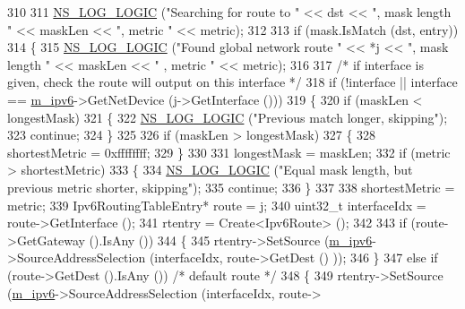 \begin{DoxyCode}
310 
311       \hyperlink{group__logging_ga88acd260151caf2db9c0fc84997f45ce}{NS\_LOG\_LOGIC} (\textcolor{stringliteral}{"Searching for route to "} << dst << \textcolor{stringliteral}{", mask length "} << maskLen << \textcolor{stringliteral}{",
       metric "} << metric);
312 
313       \textcolor{keywordflow}{if} (mask.IsMatch (dst, entry))
314         \{
315           \hyperlink{group__logging_ga88acd260151caf2db9c0fc84997f45ce}{NS\_LOG\_LOGIC} (\textcolor{stringliteral}{"Found global network route "} << *j << \textcolor{stringliteral}{", mask length "} << maskLen << \textcolor{stringliteral}{"
      , metric "} << metric);
316 
317           \textcolor{comment}{/* if interface is given, check the route will output on this interface */}
318           \textcolor{keywordflow}{if} (!interface || interface == \hyperlink{classns3_1_1Ipv6StaticRouting_aeb0293ac3549a6ca0ba7674d35646fc8}{m\_ipv6}->GetNetDevice (j->GetInterface ()))
319             \{
320               \textcolor{keywordflow}{if} (maskLen < longestMask)
321                 \{
322                   \hyperlink{group__logging_ga88acd260151caf2db9c0fc84997f45ce}{NS\_LOG\_LOGIC} (\textcolor{stringliteral}{"Previous match longer, skipping"});
323                   \textcolor{keywordflow}{continue};
324                 \}
325 
326               \textcolor{keywordflow}{if} (maskLen > longestMask)
327                 \{
328                   shortestMetric = 0xffffffff;
329                 \}
330 
331               longestMask = maskLen;
332               \textcolor{keywordflow}{if} (metric > shortestMetric)
333                 \{
334                   \hyperlink{group__logging_ga88acd260151caf2db9c0fc84997f45ce}{NS\_LOG\_LOGIC} (\textcolor{stringliteral}{"Equal mask length, but previous metric shorter, skipping"});
335                   \textcolor{keywordflow}{continue};
336                 \}
337 
338               shortestMetric = metric;
339               Ipv6RoutingTableEntry* route = j;
340               uint32\_t interfaceIdx = route->GetInterface ();
341               rtentry = Create<Ipv6Route> ();
342 
343               \textcolor{keywordflow}{if} (route->GetGateway ().IsAny ())
344                 \{
345                   rtentry->SetSource (\hyperlink{classns3_1_1Ipv6StaticRouting_aeb0293ac3549a6ca0ba7674d35646fc8}{m\_ipv6}->SourceAddressSelection (interfaceIdx, route->GetDest ()
      ));
346                 \}
347               \textcolor{keywordflow}{else} \textcolor{keywordflow}{if} (route->GetDest ().IsAny ()) \textcolor{comment}{/* default route */}
348                 \{
349                   rtentry->SetSource (\hyperlink{classns3_1_1Ipv6StaticRouting_aeb0293ac3549a6ca0ba7674d35646fc8}{m\_ipv6}->SourceAddressSelection (interfaceIdx, route->

\end{DoxyCode}
